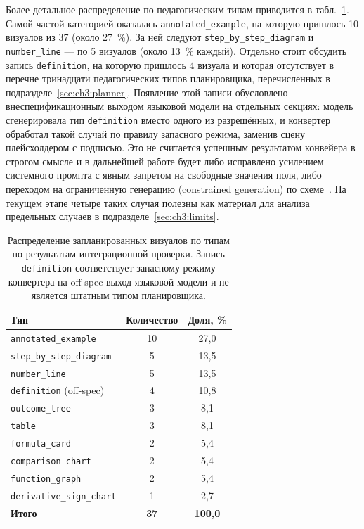 Более детальное распределение по педагогическим типам приводится в табл.~\ref{tab:ch3:type-distribution}. Самой частой категорией оказалась \texttt{annotated\_example}, на которую пришлось 10 визуалов из 37 (около 27~\%). За ней следуют \texttt{step\_by\_step\_diagram} и \texttt{number\_line} — по 5 визуалов (около 13~\% каждый). Отдельно стоит обсудить запись \texttt{definition}, на которую пришлось 4 визуала и которая отсутствует в перечне тринадцати педагогических типов планировщика, перечисленных в подразделе~\ref{sec:ch3:planner}. Появление этой записи обусловлено внеспецификационным выходом языковой модели на отдельных секциях: модель сгенерировала тип \texttt{definition} вместо одного из разрешённых, и конвертер обработал такой случай по правилу запасного режима, заменив сцену плейсхолдером с подписью. Это не считается успешным результатом конвейера в строгом смысле и в дальнейшей работе будет либо исправлено усилением системного промпта с явным запретом на свободные значения поля, либо переходом на ограниченную генерацию (constrained generation) по схеме~\cite{Willard2023Outlines}. На текущем этапе четыре таких случая полезны как материал для анализа предельных случаев в подразделе~\ref{sec:ch3:limits}.

\begin{table}[htbp]
\centering
\caption{Распределение запланированных визуалов по типам по результатам интеграционной проверки. Запись \texttt{definition} соответствует запасному режиму конвертера на off-spec\nobreakdash{}-выход языковой модели и не является штатным типом планировщика.}
\label{tab:ch3:type-distribution}
\small
\begin{tabular}{lcc}
\toprule
\textbf{Тип} & \textbf{Количество} & \textbf{Доля, \%} \\
\midrule
\texttt{annotated\_example}    & 10 & 27{,}0 \\
\texttt{step\_by\_step\_diagram} & 5 & 13{,}5 \\
\texttt{number\_line}          &  5 & 13{,}5 \\
\texttt{definition} (off-spec) &  4 & 10{,}8 \\
\texttt{outcome\_tree}         &  3 &  8{,}1 \\
\texttt{table}                 &  3 &  8{,}1 \\
\texttt{formula\_card}         &  2 &  5{,}4 \\
\texttt{comparison\_chart}     &  2 &  5{,}4 \\
\texttt{function\_graph}       &  2 &  5{,}4 \\
\texttt{derivative\_sign\_chart} & 1 &  2{,}7 \\
\midrule
\textbf{Итого}                 & \textbf{37} & \textbf{100{,}0} \\
\bottomrule
\end{tabular}
\end{table}

